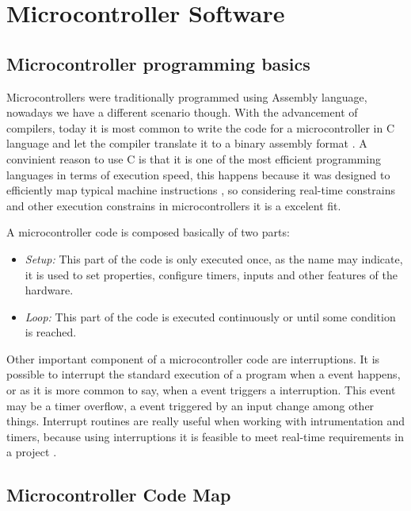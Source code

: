 \section{Microcontroller Software}

	\subsection{Microcontroller programming basics}
		Microcontrollers were traditionally programmed using Assembly language, nowadays we have a different scenario though. With the advancement of compilers, today it is most common to write the code for a microcontroller in C language and let the compiler translate it to a binary assembly format \cite{Mazidi:2010:AME:1824214}. A convinient reason to use C is that it is one of the most efficient programming languages in terms of execution speed, this happens because it was designed to efficiently map typical machine instructions \cite{kernighan2006c}, so considering real-time constrains and other execution constrains in microcontrollers it is a excelent fit.
		
		\par
		A microcontroller code is composed basically of two parts:
		
		\begin{itemize}
			\item \textit{Setup: } This part of the code is only executed once, as the name may indicate, it is used to set properties, configure timers, inputs and other features of the hardware.
			\item \textit{Loop: } This part of the code is executed continuously or until some condition is reached. 
		\end{itemize}
		
		\par
		
		Other important component of a microcontroller code are interruptions. It is possible to interrupt the standard execution of a program when a event happens, or as it is more common to say, when a event triggers a interruption. This event may be a timer overflow, a event triggered by an input change among other things. Interrupt routines are really useful when working with intrumentation and timers, because using interruptions it is feasible to meet real-time requirements in a project \cite{mukaro1999microcontroller}.
		
	\subsection{Microcontroller Code Map}
	
